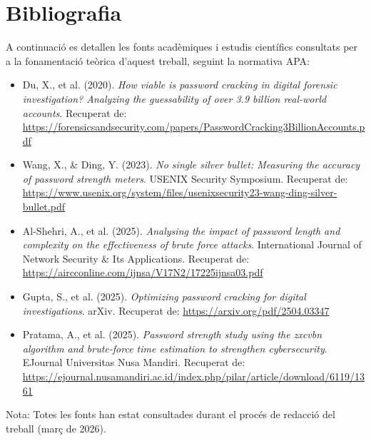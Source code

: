 \cleardoublepage
\chapter{Bibliografia}

A continuació es detallen les fonts acadèmiques i estudis científics consultats per a la fonamentació teòrica d'aquest treball, seguint la normativa APA:

\begin{itemize}
    \item Du, X., et al. (2020). \textit{How viable is password cracking in digital forensic investigation? Analyzing the guessability of over 3.9 billion real-world accounts}. Recuperat de: \url{https://forensicsandsecurity.com/papers/PasswordCracking3BillionAccounts.pdf}
    
    \item Wang, X., \& Ding, Y. (2023). \textit{No single silver bullet: Measuring the accuracy of password strength meters}. USENIX Security Symposium. Recuperat de: \url{https://www.usenix.org/system/files/usenixsecurity23-wang-ding-silver-bullet.pdf}
    
    \item Al-Shehri, A., et al. (2025). \textit{Analysing the impact of password length and complexity on the effectiveness of brute force attacks}. International Journal of Network Security \& Its Applications. Recuperat de: \url{https://aircconline.com/ijnsa/V17N2/17225ijnsa03.pdf}
    
    \item Gupta, S., et al. (2025). \textit{Optimizing password cracking for digital investigations}. arXiv. Recuperat de: \url{https://arxiv.org/pdf/2504.03347}
    
    \item Pratama, A., et al. (2025). \textit{Password strength study using the zxcvbn algorithm and brute-force time estimation to strengthen cybersecurity}. EJournal Universitas Nusa Mandiri. Recuperat de: \url{https://ejournal.nusamandiri.ac.id/index.php/pilar/article/download/6119/1361}
\end{itemize}

\vspace{1cm}
\small
\color{gray}
Nota: Totes les fonts han estat consultades durant el procés de redacció del treball (març de 2026).
